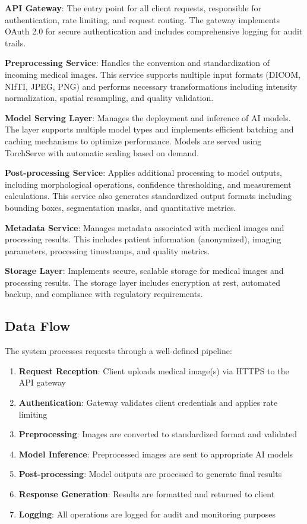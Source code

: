 \documentclass[12pt,a4paper]{article}
\begin{document}
\textbf{API Gateway}: The entry point for all client requests, responsible for authentication, rate limiting, and request routing. The gateway implements OAuth 2.0 for secure authentication and includes comprehensive logging for audit trails.

\textbf{Preprocessing Service}: Handles the conversion and standardization of incoming medical images. This service supports multiple input formats (DICOM, NIfTI, JPEG, PNG) and performs necessary transformations including intensity normalization, spatial resampling, and quality validation.

\textbf{Model Serving Layer}: Manages the deployment and inference of AI models. The layer supports multiple model types and implements efficient batching and caching mechanisms to optimize performance. Models are served using TorchServe with automatic scaling based on demand.

\textbf{Post-processing Service}: Applies additional processing to model outputs, including morphological operations, confidence thresholding, and measurement calculations. This service also generates standardized output formats including bounding boxes, segmentation masks, and quantitative metrics.

\textbf{Metadata Service}: Manages metadata associated with medical images and processing results. This includes patient information (anonymized), imaging parameters, processing timestamps, and quality metrics.

\textbf{Storage Layer}: Implements secure, scalable storage for medical images and processing results. The storage layer includes encryption at rest, automated backup, and compliance with regulatory requirements.

\subsection{Data Flow}

The system processes requests through a well-defined pipeline:

\begin{enumerate}
    \item \textbf{Request Reception}: Client uploads medical image(s) via HTTPS to the API gateway
    \item \textbf{Authentication}: Gateway validates client credentials and applies rate limiting
    \item \textbf{Preprocessing}: Images are converted to standardized format and validated
    \item \textbf{Model Inference}: Preprocessed images are sent to appropriate AI models
    \item \textbf{Post-processing}: Model outputs are processed to generate final results
    \item \textbf{Response Generation}: Results are formatted and returned to client
    \item \textbf{Logging}: All operations are logged for audit and monitoring purposes
\end{enumerate}
\end{document}
